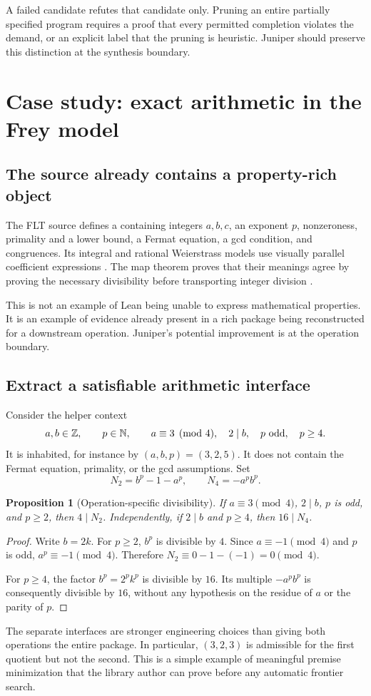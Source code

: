 \documentclass[11pt,a4paper]{article}
\newcommand{\code}[1]{\texttt{\small\detokenize{#1}}}
\newtheorem{proposition}[theorem]{Proposition}
\theoremstyle{definition}\newtheorem{definition}[theorem]{Definition}
\theoremstyle{remark}\newtheorem{remark}[theorem]{Remark}
\begin{document}
A failed candidate refutes that candidate only. Pruning an entire partially specified program requires a proof that every permitted completion violates the demand, or an explicit label that the pruning is heuristic. Juniper should preserve this distinction at the synthesis boundary.

\section{Case study: exact arithmetic in the Frey model}
\label{sec:frey}
\subsection{The source already contains a property-rich object}
The FLT source defines a \code{FreyPackage} containing integers $a,b,c$, an exponent $p$, nonzeroness, primality and a lower bound, a Fermat equation, a gcd condition, and congruences. Its integral and rational Weierstrass models use visually parallel coefficient expressions \cite{freyDef}. The map theorem proves that their meanings agree by proving the necessary divisibility before transporting integer division \cite{freyMap}.

This is not an example of Lean being unable to express mathematical properties. It is an example of evidence already present in a rich package being reconstructed for a downstream operation. Juniper's potential improvement is at the operation boundary.

\subsection{Extract a satisfiable arithmetic interface}
Consider the helper context
\begin{equation}\label{eq:freycontext}
 a,b\in\mathbb Z,\qquad p\in\mathbb N,\qquad
 a\equiv3\pmod4,\quad 2\mid b,\quad p\text{ odd},\quad p\ge4.
\end{equation}
It is inhabited, for instance by $(a,b,p)=(3,2,5)$. It does not contain the Fermat equation, primality, or the gcd assumptions. Set
\[
 N_2=b^p-1-a^p,\qquad N_4=-a^pb^p.
\]
\begin{proposition}[Operation-specific divisibility]\label{prop:frey}
If $a\equiv3\pmod4$, $2\mid b$, $p$ is odd, and $p\ge2$, then $4\mid N_2$. Independently, if $2\mid b$ and $p\ge4$, then $16\mid N_4$.
\end{proposition}
\begin{proof}
Write $b=2k$. For $p\ge2$, $b^p$ is divisible by $4$. Since $a\equiv-1\pmod4$ and $p$ is odd, $a^p\equiv-1\pmod4$. Therefore $N_2\equiv0-1-(-1)=0\pmod4$.

For $p\ge4$, the factor $b^p=2^pk^p$ is divisible by $16$. Its multiple $-a^pb^p$ is consequently divisible by $16$, without any hypothesis on the residue of $a$ or the parity of $p$.
\end{proof}
The separate interfaces are stronger engineering choices than giving both operations the entire package. In particular, $(3,2,3)$ is admissible for the first quotient but not the second. This is a simple example of meaningful premise minimization that the library author can prove before any automatic frontier search.
\end{document}
